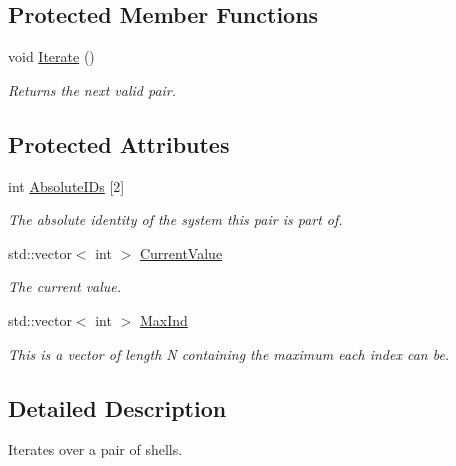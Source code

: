 \subsection*{Protected Member Functions}
\begin{DoxyCompactItemize}
\item 
void \hyperlink{classJKBuilder_1_1ShellPairIterator_a7874a07e98b52f4f147cde6f39353bae}{Iterate} ()
\begin{DoxyCompactList}\small\item\em Returns the next valid pair. \item\end{DoxyCompactList}\end{DoxyCompactItemize}
\subsection*{Protected Attributes}
\begin{DoxyCompactItemize}
\item 
int \hyperlink{classJKBuilder_1_1PairIterator_a5c96d22e39dea8044c7caf8c1213e813}{AbsoluteIDs} \mbox{[}2\mbox{]}
\begin{DoxyCompactList}\small\item\em The absolute identity of the system this pair is part of. \item\end{DoxyCompactList}\item 
std::vector$<$ int $>$ \hyperlink{classJKBuilder_1_1Iterator_a20ca24f6d827aba144bb087c4bcb74a0}{CurrentValue}
\begin{DoxyCompactList}\small\item\em The current value. \item\end{DoxyCompactList}\item 
std::vector$<$ int $>$ \hyperlink{classJKBuilder_1_1Iterator_ab6b56d3c4e9353bc938dd6249cde9ca0}{MaxInd}
\begin{DoxyCompactList}\small\item\em This is a vector of length N containing the maximum each index can be. \item\end{DoxyCompactList}\end{DoxyCompactItemize}


\subsection{Detailed Description}
Iterates over a pair of shells. 

